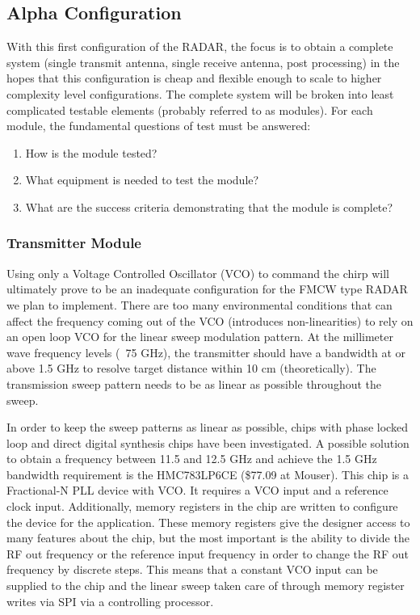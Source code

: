 \documentclass[]{article}
\begin{document}
\subsection{Alpha Configuration}

With this first configuration of the RADAR, the focus is to obtain a complete system (single transmit antenna, single receive antenna, post processing) in the hopes that this configuration is cheap and flexible enough to scale to higher complexity level configurations. The complete system will be broken into least complicated testable elements (probably referred to as modules). For each module, the fundamental questions of test must be answered:

\begin{enumerate}
	\item How is the module tested? \\
	\item What equipment is needed to test the module? \\
	\item What are the success criteria demonstrating that the module is complete? \\
\end{enumerate}

\subsubsection{Transmitter Module}
Using only a Voltage Controlled Oscillator (VCO) to command the chirp will ultimately prove to be an inadequate configuration for the FMCW type RADAR we plan to implement. There are too many environmental conditions that can affect the frequency coming out of the VCO (introduces non-linearities) to rely on an open loop VCO for the linear sweep modulation pattern. At the millimeter wave frequency levels (~75 GHz), the transmitter should have a bandwidth at or above 1.5 GHz to resolve target distance within 10 cm (theoretically). The transmission sweep pattern needs to be as linear as possible throughout the sweep.

In order to keep the sweep patterns as linear as possible, chips with phase locked loop and direct digital synthesis chips have been investigated. A possible solution to obtain a frequency between 11.5 and 12.5 GHz and achieve the 1.5 GHz bandwidth requirement is the HMC783LP6CE (\$77.09 at Mouser). This chip is a Fractional-N PLL device with VCO. It requires a VCO input and a reference clock input. Additionally, memory registers in the chip are written to configure the device for the application. These memory registers give the designer access to many features about the chip, but the most important is the ability to divide the RF out frequency or the reference input frequency in order to change the RF out frequency by discrete steps. This means that a constant VCO input can be supplied to the chip and the linear sweep taken care of through memory register writes via SPI via a controlling processor.
\end{document}
